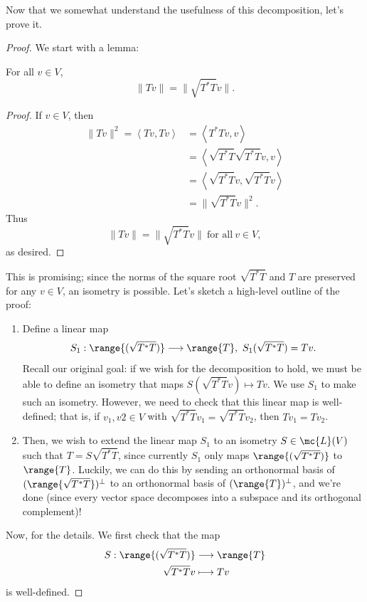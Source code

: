 \documentclass[math0540-lecture-notes.tex]{subfiles}
\begin{document}
Now that we somewhat understand the usefulness of this decomposition, let's prove it.
\begin{proof}[Proof]
  We start with a lemma:
  \begin{lemma}{}
    For all $v\in V$, \[
      \|Tv\|=\|\sqrt{T^*T}v\|
    .\] 
  \end{lemma}
  \begin{proof}[Proof]
    If $v\in V$, then
    \begin{align*}
      \|Tv\|^2=\left<Tv,Tv \right> &= \left<T^*Tv,v \right>  \\
      &= \left<\sqrt{T^*T}\sqrt{T^*T}v,v \right>  \\
      &= \left<\sqrt{T^*T}v,\sqrt{T^*T}v \right>  \\
      &=\|\sqrt{T^*T}v\|^2
    .\end{align*}
    Thus \[
      \|Tv\|=\|\sqrt{T^*T}v\|~\text{for all}~v\in V
    ,\] as desired.
  \end{proof}
  
  This is promising; since the norms of the square root $\sqrt{T^*T}$ and $T$ are preserved for any
  $v\in V$, an isometry is possible. Let's sketch a high-level outline of the proof:
  \begin{enumerate}
    \item Define a linear map \[
        S_1:\range{(\sqrt{T^*T})}\longrightarrow \range{T},\ S_1(\sqrt{T^*T})=Tv
      .\] Recall our original goal: if we wish for the decomposition to hold, we must be able to
      define an isometry that maps $S(\sqrt{T^*T}v)\mapsto Tv$. We use $S_1$ to make such an
      isometry. However, we need to check that this linear map is well-defined; that is, if
      $v_1,v2\in V$ with $\sqrt{T^*T}v_1=\sqrt{T^*T}v_2$, then $Tv_1=Tv_2$.
    \item Then, we wish to extend the linear map $S_1$ to an isometry $S\in \mc{L}(V)$ such that
      $T=S\sqrt{T^*T}$, since currently $S_1$ only maps $\range{(\sqrt{T^*T})}$ to $\range{T}$.
      Luckily, we can do this by sending an orthonormal basis of $(\range{\sqrt{T^*T}})^\bot$ to an
      orthonormal basis of $(\range{T})^\bot$, and we're done (since every vector space decomposes
      into a subspace and its orthogonal complement)!
  \end{enumerate}

  Now, for the details. We first check that the map \begin{align*}
    S: \range{(\sqrt{T^*T})} &\longrightarrow \range{T} \\
    \sqrt{T^*T}v &\longmapsto Tv
  \end{align*} is well-defined.
  
\end{proof}
\end{document}
